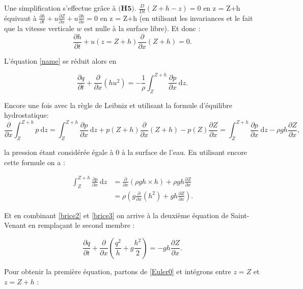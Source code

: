 \documentclass[
11pt, %
francais, %
singlespacing, %
headsepline, %
]{MastersDoctoralThesis} %
\theoremstyle{definition}
\begin{document}
Une simplification s'effectue grâce à $\textbf{(H5)}$.  $\frac{D}{Dt} (Z+h-z) = 0$ en z = Z+h équivaut à $\frac{\partial h}{\partial t}+u\frac{\partial Z}{\partial x}+u\frac{\partial h}{\partial x}=0$ en z = Z+h (en utilisant les invariances et le fait que la vitesse verticale $w$ est nulle à la surface libre). Et donc : $$\frac{\partial h}{\partial t}+u(z=Z+h)\frac{\partial}{\partial x}(Z+h)=0.$$

L'équation \ref{name} se réduit alors en

\begin{equation}
 \frac{\partial q}{\partial t}+ \frac{\partial}{\partial x}(hu^{2})=-\frac{1}{\rho}\int_{Z}^{Z+h}\frac{\partial p}{\partial x} ~\mathrm dz. \label{brice2}
 \end{equation}

Encore une fois avec la règle de Leibniz et utilisant la formule d'équilibre hydrostatique:
$$ \frac{\partial }{\partial x}\int_{Z}^{Z+h}p ~\mathrm dz =\int_{Z}^{Z+h}\frac{\partial p}{\partial x}~\mathrm dz + p(Z+h)\frac{\partial}{\partial x}(Z+h)-p(Z)\frac{\partial Z}{\partial x} = \int_{Z}^{Z+h}\frac{\partial p}{\partial x} ~\mathrm dz-\rho g h\frac{\partial Z}{\partial x},$$ 

la pression étant considérée égale à $0$ à la surface de l'eau. En utilisant encore cette formule on a :

\begin{equation}
\begin{split}
\int_{Z}^{Z+h}\frac{\partial p}{\partial x} ~\mathrm dz&=\frac{\partial}{\partial x} (\rho gh\times h) + \rho gh\frac{\partial Z}{\partial x}\\ \label{brice3}
&=\rho(g\frac{\partial}{\partial x}(h^{2})+gh\frac{\partial Z}{\partial x}).
\end{split}
\end{equation}

Et en combinant \ref{brice2} et \ref{brice3} on arrive à la deuxième équation de Saint-Venant en rempla\c cant le second membre :

\begin{equation}
\frac{\partial q}{\partial t}+\frac{\partial}{\partial x}(\frac{q^{2}}{h}+g\frac{h^{2}}{2})=-g h\frac{\partial Z}{\partial x}. \label{EqSaintVenant2}
\end{equation}


Pour obtenir la première équation, partons de \ref{Euler0} et intégrons entre $z=Z$ et $z=Z+h$ :
\end{document}
